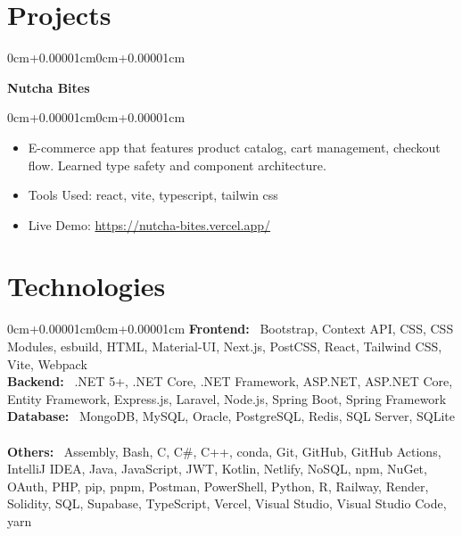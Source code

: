 \documentclass[10pt, letterpaper]{article}
\newenvironment{highlights}{\begin{itemize}[topsep=0.10cm,parsep=0.10cm,partopsep=0pt,itemsep=0pt,leftmargin=0cm+10pt]}{\end{itemize}}
\newenvironment{onecolentry}{\begin{adjustwidth}{0cm+0.00001cm}{0cm+0.00001cm}}{\end{adjustwidth}}
\newenvironment{twocolentry}[2][]{\onecolentry\def\secondColumn{#2}\setcolumnwidth{\fill,8cm}\begin{paracol}{2}}{\switchcolumn \raggedleft \secondColumn\end{paracol}\endonecolentry}
\begin{document}
\section{Projects}

    \begin{twocolentry}{2025}
      \textbf{Nutcha Bites}\end{twocolentry}
    \vspace{0.10cm}
    \begin{onecolentry}
      \begin{highlights}
        \item E-commerce app that features product catalog, cart management, checkout flow. Learned type safety and component architecture.
        \item Tools Used: react, vite, typescript, tailwin css
        \item Live Demo: \href{https://nutcha-bites.vercel.app/}{https://nutcha-bites.vercel.app/}
      \end{highlights}
    \end{onecolentry}
    \vspace{0.15cm}
  
\section{Technologies}
\begin{onecolentry}
    \textbf{Frontend:} \
    Bootstrap, Context API, CSS, CSS Modules, esbuild, HTML, Material-UI, Next.js, PostCSS, React, Tailwind CSS, Vite, Webpack \
    \vspace{0.10cm}
    \\ \textbf{Backend:} \
    .NET 5+, .NET Core, .NET Framework, ASP.NET, ASP.NET Core, Entity Framework, Express.js, Laravel, Node.js, Spring Boot, Spring Framework \
    \vspace{0.10cm}
    \\ \textbf{Database:} \
    MongoDB, MySQL, Oracle, PostgreSQL, Redis, SQL Server, SQLite \
    \vspace{0.10cm}
    \\ \textbf{Others:} \
    Assembly, Bash, C, C\#, C++, conda, Git, GitHub, GitHub Actions, IntelliJ IDEA, Java, JavaScript, JWT, Kotlin, Netlify, NoSQL, npm, NuGet, OAuth, PHP, pip, pnpm, Postman, PowerShell, Python, R, Railway, Render, Solidity, SQL, Supabase, TypeScript, Vercel, Visual Studio, Visual Studio Code, yarn \
    \vspace{0.10cm}

\end{onecolentry}
\end{document}
